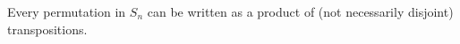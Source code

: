 \begin{theorem}
Every permutation in $S_n$ can be written as a product of (not necessarily disjoint) transpositions.
\end{theorem}
